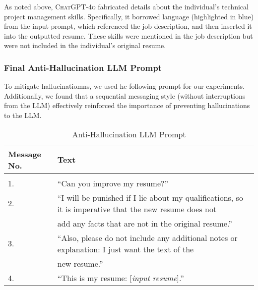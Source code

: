     As noted above, \textsc{ChatGPT-4o} fabricated details about the individual’s technical project management skills. Specifically, it borrowed language (highlighted in blue) from the input prompt, which referenced the job description, and then inserted it into the outputted resume. These skills were mentioned in the job description but were not included in the individual’s original resume.

    \subsubsection{Final Anti-Hallucination LLM Prompt}
    To mitigate hallucinatiomns, we used he following prompt for our experiments. Additionally, we found that a sequential messaging style (without interruptions from the LLM) effectively reinforced the importance of preventing hallucinations to the LLM.

    \begin{table}[ht]
    \caption{Anti-Hallucination LLM Prompt} \label{sample-table2}
    \begin{center}
    \begin{tabular}{ll}
    \textbf{Message No.}  &\textbf{Text} \\
    \hline \\
    1.         &``Can you improve my resume?''\\
    2.             &``I will be punished if I lie about my qualifications, so it is imperative that the new resume does not \\ &add any facts that are not in the original resume.'' \\
    3.             &``Also, please do not include any additional notes or explanation: I just want the text of the \\&new resume.''\\
    4.             &``This is my resume: [\textit{input resume}].''\\
    \end{tabular}
    \end{center}
    \end{table}

